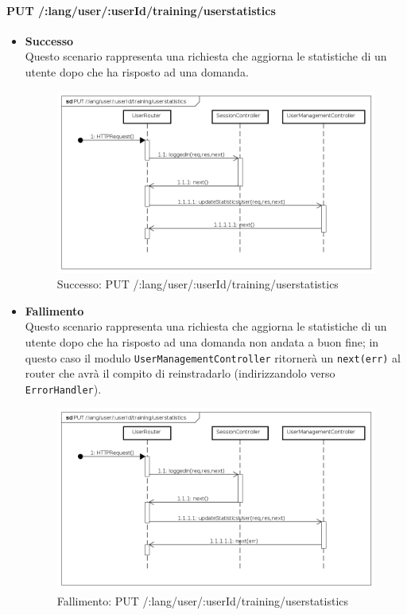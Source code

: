 \paragraph{PUT /:lang/user/:userId/training/userstatistics} %
\begin{itemize}
\item \textbf{Successo}\\
Questo scenario rappresenta una richiesta che aggiorna le statistiche di un utente dopo che ha risposto ad una domanda.

\begin{figure}[ht]
	\centering
	\includegraphics[scale=0.45]{UML/DiagrammiDiSequenza/Back-end/PUT__lang_user__userId_training_userstatistics_success.png}
	\caption{Successo: PUT /:lang/user/:userId/training/userstatistics}
\end{figure}
\FloatBarrier

\item \textbf{Fallimento}\\
Questo scenario rappresenta una richiesta che aggiorna le statistiche di un utente dopo che ha risposto ad una domanda non andata a buon fine; in questo caso il modulo \texttt{UserManagementController} ritornerà un \texttt{next(err)} al router che avrà il compito di reinstradarlo (indirizzandolo verso \texttt{ErrorHandler}).

\begin{figure}[ht]
	\centering
	\includegraphics[scale=0.45]{UML/DiagrammiDiSequenza/Back-end/PUT__lang_user__userId_training_userstatistics_failure.png}
	\caption{Fallimento: PUT /:lang/user/:userId/training/userstatistics}
\end{figure}
\FloatBarrier

\end{itemize}
